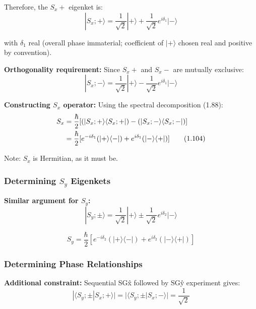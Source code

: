 \documentclass[11pt,a4paper]{article}
\begin{document}
Therefore, the $S_x+$ eigenket is:
\begin{equation}
|S_x; +\rangle = \frac{1}{\sqrt{2}}|+\rangle + \frac{1}{\sqrt{2}}e^{i\delta_1}|-\rangle
\tag{1.102}
\end{equation}

with $\delta_1$ real (overall phase immaterial; coefficient of $|+\rangle$ chosen real and positive by convention).

\textbf{Orthogonality requirement:} Since $S_x+$ and $S_x-$ are mutually exclusive:
\begin{equation}
|S_x; -\rangle = \frac{1}{\sqrt{2}}|+\rangle - \frac{1}{\sqrt{2}}e^{i\delta_1}|-\rangle
\tag{1.103}
\end{equation}

\textbf{Constructing $S_x$ operator:}
Using the spectral decomposition (1.88):
\begin{align}
S_x &= \frac{\hbar}{2}[(|S_x; +\rangle\langle S_x; +|) - (|S_x; -\rangle\langle S_x; -|)] \notag \\
&= \frac{\hbar}{2}[e^{-i\delta_1}(|+\rangle\langle -|) + e^{i\delta_1}(|-\rangle\langle +|)]
\tag{1.104}
\end{align}

Note: $S_x$ is Hermitian, as it must be.

\subsubsection{Determining $S_y$ Eigenkets}

\textbf{Similar argument for $S_y$:}
\begin{equation}
|S_y; \pm\rangle = \frac{1}{\sqrt{2}}|+\rangle \pm \frac{1}{\sqrt{2}}e^{i\delta_2}|-\rangle
\tag{1.105}
\end{equation}

\begin{equation}
S_y = \frac{\hbar}{2}[e^{-i\delta_2}(|+\rangle\langle -|) + e^{i\delta_2}(|-\rangle\langle +|)]
\tag{1.106}
\end{equation}

\subsubsection{Determining Phase Relationships}

\textbf{Additional constraint:} Sequential SGx̂ followed by SGŷ experiment gives:
\begin{equation}
|\langle S_y; \pm|S_x; +\rangle| = |\langle S_y; \pm|S_x; -\rangle| = \frac{1}{\sqrt{2}}
\tag{1.107}
\end{equation}
\end{document}
